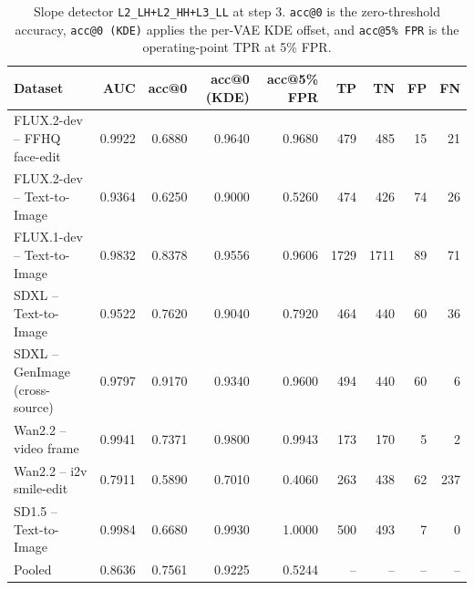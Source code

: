 \begin{table}[t]
\centering
\small
\setlength{\tabcolsep}{5pt}
\begin{tabular}{lrrrrrrrr}
\toprule
Dataset & AUC & acc@0 & acc@0 (KDE) & acc@5\% FPR & TP & TN & FP & FN \\
\midrule
FLUX.2-dev -- FFHQ face-edit          & 0.9922 & 0.6880 & 0.9640 & 0.9680 & 479 & 485 & 15 & 21 \\
FLUX.2-dev -- Text-to-Image           & 0.9364 & 0.6250 & 0.9000 & 0.5260 & 474 & 426 & 74 & 26 \\
FLUX.1-dev -- Text-to-Image           & 0.9832 & 0.8378 & 0.9556 & 0.9606 & 1729 & 1711 & 89 & 71 \\
SDXL -- Text-to-Image                 & 0.9522 & 0.7620 & 0.9040 & 0.7920 & 464 & 440 & 60 & 36 \\
SDXL -- GenImage (cross-source)       & 0.9797 & 0.9170 & 0.9340 & 0.9600 & 494 & 440 & 60 & 6 \\
Wan2.2 -- video frame                 & 0.9941 & 0.7371 & 0.9800 & 0.9943 & 173 & 170 & 5 & 2 \\
Wan2.2 -- i2v smile-edit              & 0.7911 & 0.5890 & 0.7010 & 0.4060 & 263 & 438 & 62 & 237 \\
SD1.5 -- Text-to-Image                & 0.9984 & 0.6680 & 0.9930 & 1.0000 & 500 & 493 & 7 & 0 \\
\midrule
Pooled                                & 0.8636 & 0.7561 & 0.9225 & 0.5244 & -- & -- & -- & -- \\
\bottomrule
\end{tabular}
\caption{Slope detector \texttt{L2\_LH+L2\_HH+L3\_LL} at step 3. \texttt{acc@0} is the zero-threshold accuracy, \texttt{acc@0 (KDE)} applies the per-VAE KDE offset, and \texttt{acc@5\% FPR} is the operating-point TPR at 5\% FPR.}
\end{table}

